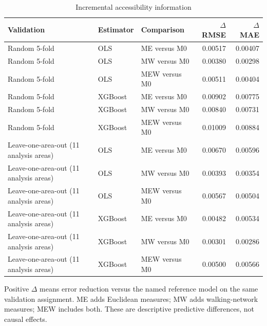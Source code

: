 \begin{table}[p]
\centering
\small
\begin{threeparttable}
\caption{Incremental accessibility information}\label{tab:incremental-accessibility}
\begin{tabular}{>{\raggedright\arraybackslash}p{4cm}>{\raggedright\arraybackslash}p{2.4cm}>{\raggedright\arraybackslash}p{3.5cm}rr}
\toprule
Validation & Estimator & Comparison & $\Delta$ RMSE & $\Delta$ MAE \\
\midrule
Random 5-fold & OLS & ME versus M0 & 0.00517 & 0.00407 \\
Random 5-fold & OLS & MW versus M0 & 0.00380 & 0.00298 \\
Random 5-fold & OLS & MEW versus M0 & 0.00511 & 0.00404 \\
Random 5-fold & XGBoost & ME versus M0 & 0.00902 & 0.00775 \\
Random 5-fold & XGBoost & MW versus M0 & 0.00840 & 0.00731 \\
Random 5-fold & XGBoost & MEW versus M0 & 0.01009 & 0.00884 \\
Leave-one-area-out (11 analysis areas) & OLS & ME versus M0 & 0.00670 & 0.00596 \\
Leave-one-area-out (11 analysis areas) & OLS & MW versus M0 & 0.00393 & 0.00354 \\
Leave-one-area-out (11 analysis areas) & OLS & MEW versus M0 & 0.00567 & 0.00504 \\
Leave-one-area-out (11 analysis areas) & XGBoost & ME versus M0 & 0.00482 & 0.00534 \\
Leave-one-area-out (11 analysis areas) & XGBoost & MW versus M0 & 0.00301 & 0.00286 \\
Leave-one-area-out (11 analysis areas) & XGBoost & MEW versus M0 & 0.00500 & 0.00566 \\
\bottomrule
\end{tabular}
\begin{tablenotes}[flushleft]\footnotesize
\item Positive $\Delta$ means error reduction versus the named reference model on the same validation assignment. ME adds Euclidean measures; MW adds walking-network measures; MEW includes both. These are descriptive predictive differences, not causal effects.
\end{tablenotes}
\end{threeparttable}
\end{table}
